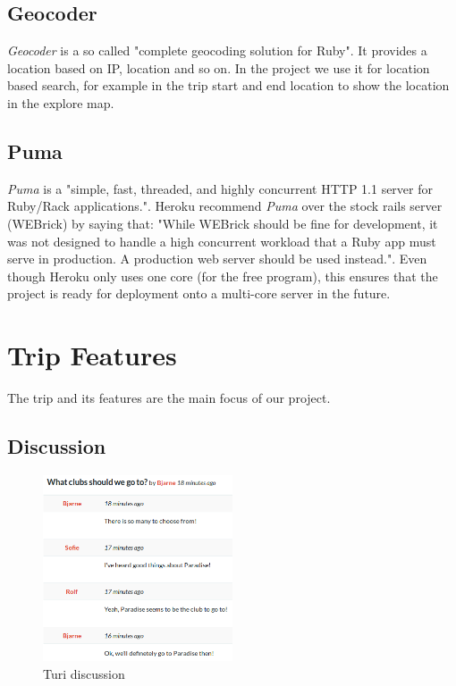 \documentclass[a4paper]{article}
\begin{document}
\subsection{Geocoder}
\textit{Geocoder} is a so called "complete geocoding solution for Ruby"\cite{geocoder}. It provides a location based on IP, location and so on. In the project we use it for location based search, for example in the trip start and end location to show the location in the explore map. 

\subsection{Puma}
\textit{Puma} is a "simple, fast, threaded, and highly concurrent HTTP 1.1 server for Ruby/Rack applications."\cite{puma}. Heroku recommend \textit{Puma} over the stock rails server (WEBrick) by saying that: "While WEBrick should be fine for development, it was not designed to handle a high concurrent workload that a Ruby app must serve in production. A production web server should be used instead."\cite{heroku}. Even though Heroku only uses one core (for the free program), this ensures that the project is ready for deployment onto a multi-core server in the future.  


\section{Trip Features}
The trip and its features are the main focus of our project. 
\subsection{Discussion}

\begin{figure}[!h]
  \begin{center}
    \vspace{-0pt}
    \includegraphics[width=0.5\textwidth]{pictures/discussion}
  \end{center}
\caption{Turi discussion}
\label{fig:discussion}
\end{figure}
\end{document}
